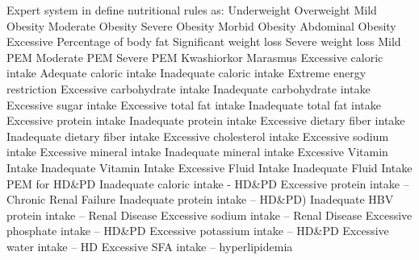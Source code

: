 Expert system in \cite{Chen2012} define nutritional rules as: 
Underweight
Overweight
Mild Obesity
Moderate Obesity
Severe Obesity
Morbid Obesity
Abdominal Obesity
Excessive Percentage of body fat
Significant weight loss
Severe weight loss
Mild PEM
Moderate PEM
Severe PEM
Kwashiorkor
Marasmus
Excessive caloric intake
Adequate caloric intake
Inadequate caloric intake
Extreme energy restriction
Excessive carbohydrate intake
Inadequate carbohydrate intake
Excessive sugar intake
Excessive total fat intake
Inadequate total fat intake
Excessive protein intake
Inadequate protein intake
Excessive dietary fiber intake
Inadequate dietary fiber intake
Excessive cholesterol intake
Excessive sodium intake
Excessive mineral intake
Inadequate mineral intake
Excessive Vitamin Intake
Inadequate Vitamin Intake
Excessive Fluid Intake
Inadequate Fluid Intake
PEM for HD\&PD
Inadequate caloric intake - HD\&PD
Excessive protein intake – Chronic Renal Failure
Inadequate protein intake – HD\&PD)
Inadequate HBV protein intake – Renal Disease
Excessive sodium intake – Renal Disease
Excessive phosphate intake – HD\&PD
Excessive potassium intake – HD\&PD
Excessive water intake – HD
Excessive SFA intake – hyperlipidemia
